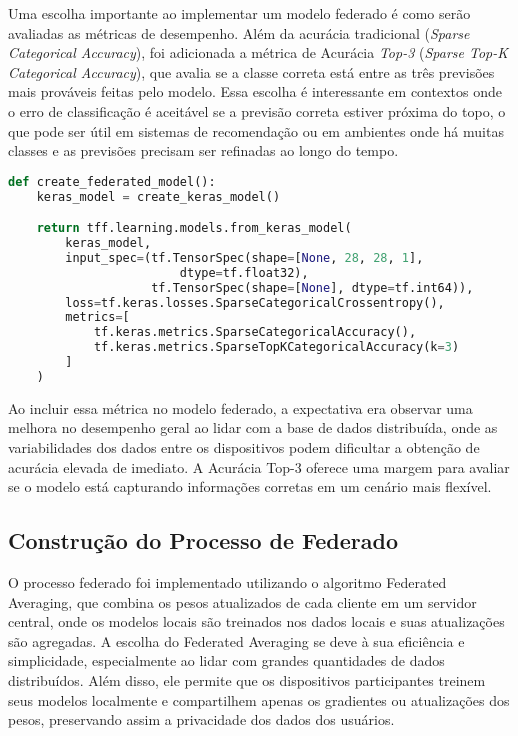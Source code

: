Uma escolha importante ao implementar um modelo federado é como serão avaliadas as métricas de desempenho. Além da acurácia tradicional (\textit{Sparse Categorical Accuracy}), foi adicionada a métrica de Acurácia \textit{Top-3} (\textit{Sparse Top-K Categorical Accuracy}), que avalia se a classe correta está entre as três previsões mais prováveis feitas pelo modelo. Essa escolha é interessante em contextos onde o erro de classificação é aceitável se a previsão correta estiver próxima do topo, o que pode ser útil em sistemas de recomendação ou em ambientes onde há muitas classes e as previsões precisam ser refinadas ao longo do tempo.

\begin{lstlisting}[language=Python, caption={Construção do modelo federado}, label={lst:build_federated_model}]
    def create_federated_model():
    keras_model = create_keras_model()

    return tff.learning.models.from_keras_model(
        keras_model,
        input_spec=(tf.TensorSpec(shape=[None, 28, 28, 1], 
                        dtype=tf.float32),
                    tf.TensorSpec(shape=[None], dtype=tf.int64)),
        loss=tf.keras.losses.SparseCategoricalCrossentropy(),
        metrics=[
            tf.keras.metrics.SparseCategoricalAccuracy(),
            tf.keras.metrics.SparseTopKCategoricalAccuracy(k=3)
        ]
    )
\end{lstlisting}

Ao incluir essa métrica no modelo federado, a expectativa era observar uma melhora no desempenho geral ao lidar com a base de dados distribuída, onde as variabilidades dos dados entre os dispositivos podem dificultar a obtenção de acurácia elevada de imediato. A Acurácia Top-3 oferece uma margem para avaliar se o modelo está capturando informações corretas em um cenário mais flexível.

\subsection{Construção do Processo de Federado}

O processo federado foi implementado utilizando o algoritmo Federated Averaging, que combina os pesos atualizados de cada cliente em um servidor central, onde os modelos locais são treinados nos dados locais e suas atualizações são agregadas. A escolha do Federated Averaging se deve à sua eficiência e simplicidade, especialmente ao lidar com grandes quantidades de dados distribuídos. Além disso, ele permite que os dispositivos participantes treinem seus modelos localmente e compartilhem apenas os gradientes ou atualizações dos pesos, preservando assim a privacidade dos dados dos usuários.

